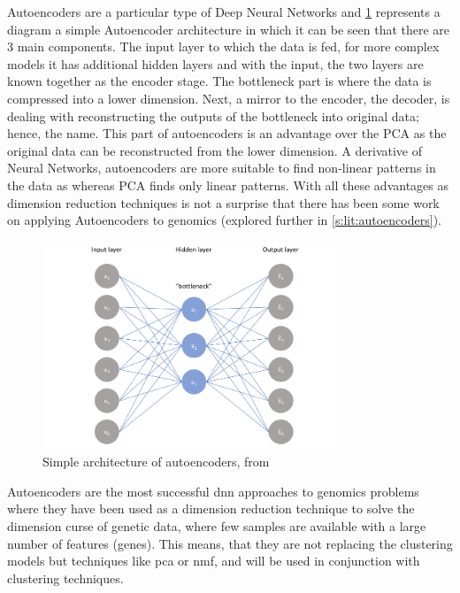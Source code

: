 Autoencoders are a particular type of Deep Neural Networks and \cref{fig:autoencoders} represents a diagram a simple Autoencoder architecture in which it can be seen that there are 3 main components. The input layer to which the data is fed, for more complex models it has additional hidden layers and with the input, the two layers are known together as the encoder stage. The bottleneck part is where the data is compressed into a lower dimension. Next, a mirror to the encoder, the decoder, is dealing with reconstructing the outputs of the bottleneck into original data; hence, the name. This part of autoencoders is an advantage over the PCA as the original data can be reconstructed from the lower dimension. A derivative of Neural Networks, autoencoders are more suitable to find non-linear patterns in the data as whereas PCA finds only linear patterns. With all these advantages as dimension reduction techniques is not a surprise that there has been some work on applying Autoencoders to genomics (explored further in \cref{s:lit:autoencoders}).

\begin{figure}[!htb]
  \centering\includegraphics[width=0.8\textwidth,height=0.5\textheight,keepaspectratio]{Sections/Lit_review/Resources/simple_autoencoders.png}
    \caption{Simple architecture of autoencoders, from \cite{Jordan2018-bc}}
    \label{fig:autoencoders}
\end{figure}
\FloatBarrier

Autoencoders are the most successful \acrshort{dnn} approaches to genomics problems where they have been used as a dimension reduction technique to solve the dimension curse of genetic data, where few samples are available with a large number of features (genes). This means, that they are not replacing the clustering models but techniques like \acrfull{pca} or \acrfull{nmf}, and will be used in conjunction with clustering techniques.



